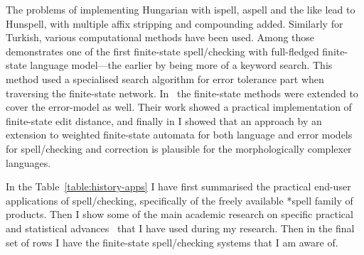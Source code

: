 \documentclass[officiallayout]{unihelcompling}
\begin{document}
The problems of implementing Hungarian with ispell, aspell and the like lead to
Hunspell, with multiple affix stripping and compounding added. Similarly for
Turkish, various computational methods have been used. Among
those~\citet{oflazer1996errortolerant} demonstrates one of the first
finite-state spell\-/checking with full-fledged finite-state language model---the
earlier by \citep{aho1975efficient} being more of a keyword search. This method
used a specialised search algorithm for error tolerance part when traversing
the finite-state network.  In~\citet{agata2002typographical} the finite-state
methods were extended to cover the error-model as well. Their work showed a
practical implementation of finite-state edit distance, and finally in
 I showed that an approach by an extension
to weighted finite-state automata for both language and error models for
spell\-/checking and correction is plausible for the morphologically complexer
languages.


In the Table~\ref{table:history-apps} I have first summarised the practical
end-user applications of spell\-/checking, specifically of the freely available
*spell family of products. Then I show some of  the main academic research
on specific practical and statistical advances~\cite{al2006learning} that I
have used during my research. Then in the final set of rows I have the
finite-state spell\-/checking systems that I am aware of.
\end{document}
